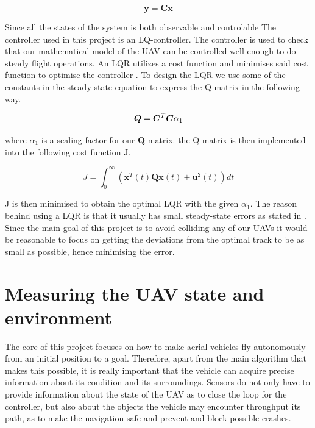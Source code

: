 \documentclass[journal]{IEEEtran}
\begin{document}
	\begin{equation} \label{eq:steady_state_2}
	\bm{y} = \bm{C} \bm{x}
	\end{equation}
	
	
	Since all the states of the system is both observable and controlable The controller used in this project is an LQ-controller. The controller is used to check that our mathematical model of the UAV can be controlled well enough to do steady flight operations.  An LQR utilizes a cost function and minimises said cost function to optimise the controller \cite{bokLQ}. To design the LQR we use some of the constants in the steady state equation to express the Q matrix in the following way.
	
	\begin{equation}
	\bm{Q}=\bm{C^}{T}\bm{C}\alpha_{1}
	\end{equation}
	
	where $\alpha_{1}$ is a scaling factor for our $\bm{Q}$ matrix.
	the Q matrix is then implemented into the following cost function J.
	
	\begin{equation}
	J = \int_{0}^{\infty} (\bm{x}^{T}(t)\bm{Q}\bm{x}(t)+\bm{u}^2(t)) dt
	\end{equation}
	
	 J is then minimised to obtain the optimal LQR with the given $\alpha_{1}$. The reason behind using a LQR is that it usually has small steady-state errors as stated in \cite{lqr_error}. Since the main goal of this project is to avoid colliding any of our UAVs it would be reasonable to focus on getting the deviations from the optimal track to be as small as possible, hence minimising the error.   
	
	\section{Measuring the UAV state and environment}
	The core of this project focuses on how to make aerial vehicles fly autonomously from an initial position to a goal. Therefore, apart from the main algorithm that makes this possible, it is really important that the vehicle can acquire precise information about its condition and its surroundings. Sensors do not only have to provide information about the state of the UAV as to close the loop for the controller, but also about the objects the vehicle may encounter throughput its path, as to make the navigation safe and prevent and block possible crashes.\\
\end{document}
